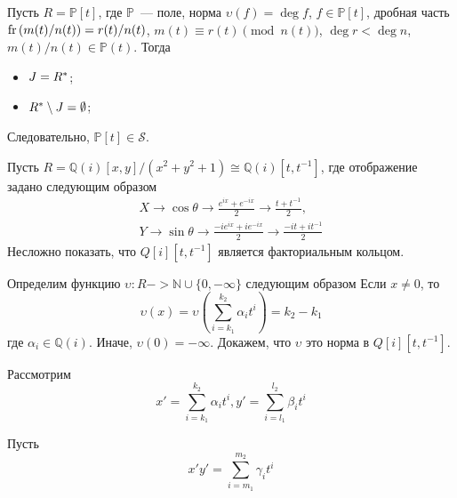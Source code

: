 \documentclass[_00_dissertation.tex]{subfiles}
\begin{document}
\begin{example}\label{example:P[t]}
    Пусть $R = \mathbb{P}[t]$, где $\mathbb{P}$~--- поле, норма $\upsilon(f)=\deg f$, $f \in \mathbb{P}[t]$, дробная часть $\textrm{fr}\left(m(t)/n(t)\right) = r(t)/n(t)$, $m(t)\equiv r(t) \pmod{n(t)}$, $\deg r < \deg n$, $m(t)/n(t) \in \mathbb{P}(t)$.
    Тогда
    \begin{itemize}
        \item $J = R^{*}$;

        \item $R^{*} \setminus J = \emptyset$;
    \end{itemize}

    Следовательно, $\mathbb{P}[t] \in \mathcal{S}$.
\end{example}

\begin{example}\label{example:coordinate_ring_of_circle}
    Пусть $R = \mathbb{Q}(i)[x, y]/(x^2 + y^2 + 1) \cong \mathbb{Q}(i)[t,  t^{-1}]$, где отображение задано следующим образом
    \begin{equation*}
        \begin{split}
            X \to \cos \theta \to \frac{e^{ix} + e^{-ix}}{2} \to \frac{t + t^{-1}}{2},\\
            Y \to \sin \theta \to \frac{-ie^{ix} + ie^{-ix}}{2} \to \frac{-it + it^{-1}}{2}
        \end{split}
    \end{equation*}
    Несложно показать, что $Q[i][t, t^{-1}]$ является факториальным кольцом.
    
    Определим функцию $\upsilon : R -> \mathbb{N} \cup \{0, -\infty\}$ следующим образом
    Если $x \neq 0$, то
    \begin{equation*}
        \upsilon(x) = \upsilon\left(
            \sum_{i=k_1}^{k_2} \alpha_i t^i
        \right) = k_2 - k_1
    \end{equation*}
    где $\alpha_i \in \mathbb{Q}(i)$.
    Иначе, $\upsilon(0) = -\infty$.
    Докажем, что $\upsilon$ это норма в $Q[i][t, t^{-1}]$.

    Рассмотрим
    \begin{equation*}
        x' = \sum_{i=k_1}^{k_2} \alpha_i t^i,
        y' = \sum_{i=l_1}^{l_2} \beta_i t^i
    \end{equation*}

    Пусть
    \begin{equation*}
        x'y' = \sum_{i=m_1}^{m_2} \gamma_i t^i
    \end{equation*}


\end{example}
\end{document}
